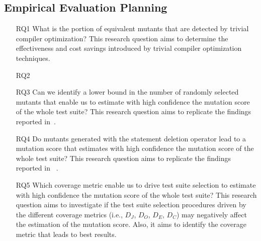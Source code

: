 

\subsection{Empirical Evaluation Planning}
\label{sec:codemutation:evaluation}


\begin{itemize}

    \item[RQ1] What is the portion of equivalent mutants that are detected by trivial compiler optimization? This research question aims to determine the effectiveness and cost savings introduced by trivial compiler optimization techniques. 

    \item[RQ2] 

    \item[RQ3] Can we identify a lower bound in the number of randomly selected mutants that enable us to estimate with high confidence the mutation score of the whole test suite? This research question aims to replicate the findings reported in~\cite{gopinath2015hard}.

    \item[RQ4] Do mutants generated with the statement deletion operator lead to a mutation score that estimates with high confidence the mutation score of the whole test suite?  This research question aims to replicate the findings reported in ~\cite{delamaro2014experimental}.
    
     \item[RQ5] Which coverage metric enable us to drive test suite selection to estimate with high confidence the mutation score of the whole test suite? This research question aims to investigate if the test suite selection procedures driven by the different coverage metrics (i.e., $D_J$, $D_O$, $D_E$, $D_C$) may negatively affect the estimation of the mutation score. Also, it aims to identify the coverage metric that leads to best results.
    

\end{itemize}
